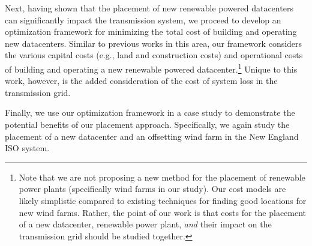 Next, having shown that the placement of new renewable powered datacenters can significantly impact the transmission system, we proceed to develop an optimization framework for minimizing the total cost of building and operating new datacenters.  Similar to previous works in this area, our framework considers the various capital costs (e.g., land and construction costs) and operational costs of building and operating a new renewable powered datacenter.\footnote{Note that we are not proposing a new method for the placement of renewable power plants (specifically wind farms in our study).  Our cost models are likely simplistic compared to existing techniques for finding good locations for new wind farms.  Rather, the point of our work is that costs for the placement of a new datacenter, renewable power plant, {\em and} their impact on the transmission grid should be studied together.}
  Unique to this work, however, is the added consideration of the cost of system loss in the transmission grid.

Finally, we use our optimization framework in a case study to demonstrate the potential benefits of our placement approach.  Specifically, we again study the placement of a new datacenter and an offsetting wind farm in the New England ISO system.  


